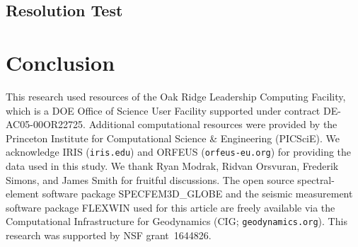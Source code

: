 \documentclass[extra,mreferee]{gji}
\begin{document}
\subsection{Resolution Test}

\section{Conclusion}


\begin{acknowledgments}
This research used resources of the Oak Ridge Leadership Computing Facility, which is a DOE Office of Science User Facility supported under contract DE-AC05-00OR22725.
Additional computational resources were provided by the Princeton Institute for Computational Science \& Engineering (PICSciE).
We acknowledge IRIS ({\tt iris.edu}) and ORFEUS ({\tt orfeus-eu.org}) for providing the data used in this study. We thank Ryan Modrak, Ridvan Orsvuran, Frederik Simons, and James Smith for fruitful discussions. 
The open source spectral-element software package SPECFEM3D\_GLOBE and the seismic measurement software package FLEXWIN used for this article are freely available via the Computational Infrastructure for Geodynamics (CIG; {\tt geodynamics.org}). This research was supported by NSF grant~1644826.
\end{acknowledgments}

\newpage


\end{document}
